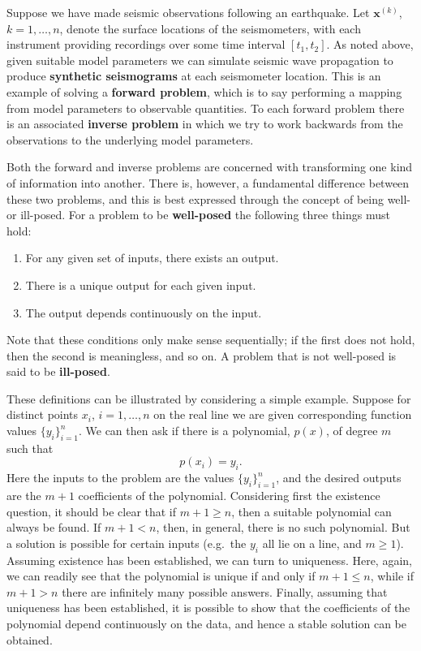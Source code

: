 Suppose we have made seismic observations following an earthquake. Let $\mathbf{x}^{(k)}$, $k=1,\dots,n$, denote the surface locations
of the seismometers, with each instrument providing recordings over some time interval $[t_1, t_2]$. As noted above, given 
suitable model parameters we can simulate seismic wave propagation to produce \textbf{synthetic seismograms} at each seismometer location. 
This is an example of solving a \textbf{forward problem}, which is to say performing a mapping from model parameters to observable quantities. 
To each forward problem there is an associated \textbf{inverse problem} in which we try to work backwards from the observations to the 
underlying model parameters.

Both the forward and inverse problems are concerned with transforming one kind of information into another. There is, however, a 
fundamental difference between these two problems, and this is best expressed through the concept of being well- or ill-posed. For a 
problem to be \textbf{well-posed}
the following three things must hold:
\begin{enumerate}
    \item For any given set of inputs, there exists an output.
    \item There is a unique output for each given input.
    \item The output depends continuously on the input.
\end{enumerate}
Note that these conditions only make sense sequentially; if the first does not hold, then the second is meaningless, and so on. A 
problem that is not well-posed is said to be \textbf{ill-posed}. 

These definitions can be illustrated by considering a simple example.
Suppose for distinct points $x_i$, $i=1,\dots,n$ on the real line we are given corresponding function values $\{y_i\}_{i=1}^n$. 
We can then ask if there is a polynomial, $p(x)$, of degree $m$ such that
\begin{equation}\label{eq:27}
p(x_i) = y_i.
\end{equation}
Here the inputs to the problem are the values $\{y_i\}_{i=1}^n$, and the desired outputs are the $m+1$ coefficients of 
the polynomial. Considering first the existence question, it should be clear that if $m+1 \ge n$, then a suitable polynomial can always be 
found. If $m+1 < n$, then, in general, there is no such polynomial. But a solution is possible for certain inputs (e.g.\ the $y_i$ 
all lie on a line, and $m\ge 1$). Assuming existence has been established, we can turn to uniqueness. Here, again, we can 
readily see that the polynomial is unique if and only if $m+1 \le n$, while if $m+1 > n$ there are infinitely many possible answers. 
Finally, assuming that uniqueness has been established, it is possible to show that the coefficients of the polynomial 
depend continuously on the data, and hence a stable solution can be obtained.

